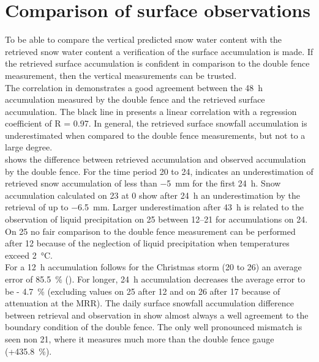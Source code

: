 \section{Comparison of surface observations} \label{sec:ret_dofe_comp}
To be able to compare the vertical predicted snow water content with the retrieved snow water content a verification of the surface accumulation is made. If the retrieved surface accumulation is confident in comparison to the double fence measurement, then the vertical measurements can be trusted.
\\
The correlation in  demonstrates a good agreement between the \SI{48}{\hour} accumulation measured by the double fence and the retrieved surface accumulation.
The black line in  presents a linear correlation with a regression coefficient of R = \num{0.97}. 
In general, the retrieved surface snowfall accumulation is underestimated when compared to the double fence measurements, but not to a large degree. 
\\
 shows the difference between retrieved accumulation and observed accumulation by the double fence. For the time period \num{20} to \SI{24}{\dec},  indicates an underestimation of retrieved snow accumulation of less than \SI{-5}{\mm} for the first \SI{24}{\hour}. 
Snow accumulation calculated on \SI{23}{\dec} at \SI{0}{\UTC} show after \SI{24}{\hour} an underestimation by the retrieval of up to \SI{-6.5}{\mm}. Larger underestimation after \SI{43}{\hour} is related to the observation of liquid precipitation on \SI{25}{\dec} between \SIrange{12}{21}{\UTC} for accumulations on \SI{24}{\dec}. On \SI{25}{\dec} no fair comparison to the double fence measurement can be performed after \SI{12}{\UTC} because of the neglection of liquid precipitation when temperatures exceed \SI{2}{\celsius}.
\\
For a \SI{12}{\hour} accumulation follows for the Christmas storm (\num{20} to \SI{26}{\dec}) an average error of \SI{85.5}{\percent} (). For longer, \SI{24}{\hour} accumulation decreases the average error to be \SI{- 4.7}{\percent} (excluding values on \SI{25}{\dec} after \SI{12}{\UTC} and on \SI{26}{\dec} after \SI{17}{\UTC} because of attenuation at the MRR). The daily surface snowfall accumulation difference between retrieval and observation in  show almost always a well agreement to the boundary condition of the double fence. The only well pronounced mismatch is seen non \SI{21}{\dec}, where it measures much more than the double fence gauge (+\SI{435.8}{\percent}).

